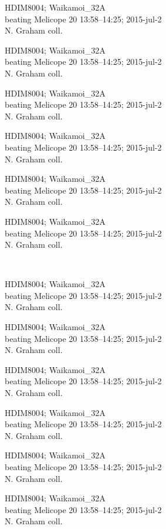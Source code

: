 \documentclass[2pt]{extarticle}
\begin{document}
\noindent
\parbox{0.16\textwidth}{\tiny \raggedright \rule[-0.3\baselineskip]{0pt}{10pt}HDIM8004; Waikamoi\_32A\\ beating Melicope 20 13:58--14:25; 2015-jul-2\\ N. Graham coll.}
\parbox{0.16\textwidth}{\tiny \raggedright \rule[-0.3\baselineskip]{0pt}{10pt}HDIM8004; Waikamoi\_32A\\ beating Melicope 20 13:58--14:25; 2015-jul-2\\ N. Graham coll.}
\parbox{0.16\textwidth}{\tiny \raggedright \rule[-0.3\baselineskip]{0pt}{10pt}HDIM8004; Waikamoi\_32A\\ beating Melicope 20 13:58--14:25; 2015-jul-2\\ N. Graham coll.}
\parbox{0.16\textwidth}{\tiny \raggedright \rule[-0.3\baselineskip]{0pt}{10pt}HDIM8004; Waikamoi\_32A\\ beating Melicope 20 13:58--14:25; 2015-jul-2\\ N. Graham coll.}
\parbox{0.16\textwidth}{\tiny \raggedright \rule[-0.3\baselineskip]{0pt}{10pt}HDIM8004; Waikamoi\_32A\\ beating Melicope 20 13:58--14:25; 2015-jul-2\\ N. Graham coll.}
\parbox{0.16\textwidth}{\tiny \raggedright \rule[-0.3\baselineskip]{0pt}{10pt}HDIM8004; Waikamoi\_32A\\ beating Melicope 20 13:58--14:25; 2015-jul-2\\ N. Graham coll.} \\ 
\vspace{0.001in} 

\noindent
\parbox{0.16\textwidth}{\tiny \raggedright \rule[-0.3\baselineskip]{0pt}{10pt}HDIM8004; Waikamoi\_32A\\ beating Melicope 20 13:58--14:25; 2015-jul-2\\ N. Graham coll.}
\parbox{0.16\textwidth}{\tiny \raggedright \rule[-0.3\baselineskip]{0pt}{10pt}HDIM8004; Waikamoi\_32A\\ beating Melicope 20 13:58--14:25; 2015-jul-2\\ N. Graham coll.}
\parbox{0.16\textwidth}{\tiny \raggedright \rule[-0.3\baselineskip]{0pt}{10pt}HDIM8004; Waikamoi\_32A\\ beating Melicope 20 13:58--14:25; 2015-jul-2\\ N. Graham coll.}
\parbox{0.16\textwidth}{\tiny \raggedright \rule[-0.3\baselineskip]{0pt}{10pt}HDIM8004; Waikamoi\_32A\\ beating Melicope 20 13:58--14:25; 2015-jul-2\\ N. Graham coll.}
\parbox{0.16\textwidth}{\tiny \raggedright \rule[-0.3\baselineskip]{0pt}{10pt}HDIM8004; Waikamoi\_32A\\ beating Melicope 20 13:58--14:25; 2015-jul-2\\ N. Graham coll.}
\parbox{0.16\textwidth}{\tiny \raggedright \rule[-0.3\baselineskip]{0pt}{10pt}HDIM8004; Waikamoi\_32A\\ beating Melicope 20 13:58--14:25; 2015-jul-2\\ N. Graham coll.} \\ 
\vspace{0.001in} 
\end{document}
